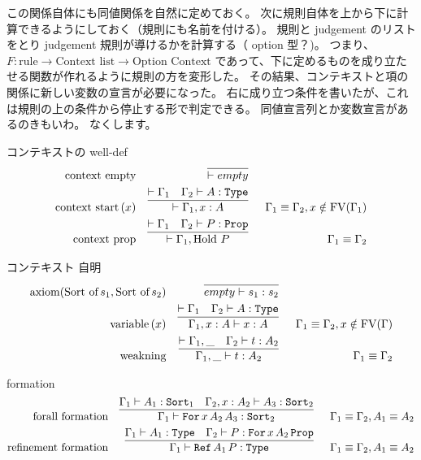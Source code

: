 この関係自体にも同値関係を自然に定めておく。
次に規則自体を上から下に計算できるようにしておく（規則にも名前を付ける）。
規則と judgement のリストをとり judgement 規則が導けるかを計算する（ option 型？)。
つまり、 \(F : \text{rule} \to \text{Context list} \to \text{Option Context}\) であって、下に定めるものを成り立たせる関数が作れるように規則の方を変形した。
その結果、コンテキストと項の関係に新しい変数の宣言が必要になった。
右に成り立つ条件を書いたが、これは規則の上の条件から停止する形で判定できる。
同値宣言列とか変数宣言があるのきもいわ。
なくします。

\begin{itembox}[l]{コンテキストの well-def}
\begin{align*}
  \text{context empty} &&
  \infer[]{\vdash empty}{} \\
  \text{context start} \, (x) &&
  \infer[]{
    \vdash \Gamma_1 , x : A}{\vdash \Gamma_1 & \Gamma_2 \vdash A : \texttt{Type}
  } && \Gamma_1 \equiv \Gamma_2 , x \notin \text{FV}(\Gamma_1) \\
  \text{context prop} &&
  \infer[]{
    \vdash \Gamma_1 , \text{Hold } P}{\vdash \Gamma_1 & \Gamma_2 \vdash P : \texttt{Prop}
  } && \Gamma_1 \equiv \Gamma_2
\end{align*}
\end{itembox}

\begin{itembox}[l]{コンテキスト 自明}
\begin{align*}
  \text{axiom} (\text{Sort of} \, s_1 , \text{Sort of} \, s_2) &&
  \infer[]{empty \vdash s_1 : s_2}{} \\
  \text{variable} \, (x) &&
  \infer[]{
    \Gamma_1 , x : A \vdash x : A}{\vdash \Gamma_1 & \Gamma_2 \vdash A : \texttt{Type}
  } && \Gamma_1 \equiv \Gamma_2 , x \notin \text{FV}(\Gamma) \\
  \text{weakning} &&
  \infer[]{
    \Gamma_1 , \_ \vdash t : A_2}{\vdash \Gamma_1 , \_ & \Gamma_2 \vdash t : A_2
  } && \Gamma_1 \equiv \Gamma_2 
\end{align*}
\end{itembox}

\begin{itembox}[l]{formation}
\begin{align*}
  \text{forall formation} &&
  \infer[]{
    \Gamma_1 \vdash \texttt{For} \, x \, A_2 \, A_3 : \texttt{Sort}_2}{\Gamma_1 \vdash A_1 : \texttt{Sort}_1 & \Gamma_2 , x : A_2 \vdash A_3 : \texttt{Sort}_2
  } && \Gamma_1 \equiv \Gamma_2 , A_1 \equiv A_2 \\
  \text{refinement formation} &&
  \infer[]{
    \Gamma_1 \vdash \texttt{Ref} \, A_1 \, P : \texttt{Type}}{\Gamma_1 \vdash A_1 : \texttt{Type} & \Gamma_2 \vdash P : \texttt{For} \, x \, A_2 \, \texttt{Prop}
  } && \Gamma_1 \equiv \Gamma_2 , A_1 \equiv A_2
\end{align*}
\end{itembox}

